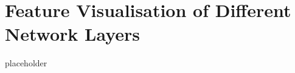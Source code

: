 
\chapter{Feature Visualisation of Different Network Layers}
\label{appendix:feature_vis}

placeholder
